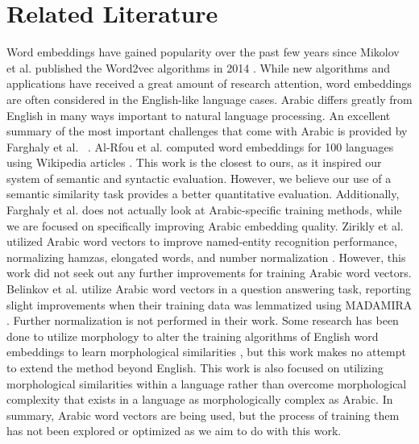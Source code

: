 \section{Related Literature}
\label{sec:literature}

Word embeddings have gained popularity over the past few years since Mikolov et al. published the Word2vec algorithms in 2014 \cite{mikolovdist:2013,mikoloveffic:2013}. While new algorithms and applications have received a great amount of research attention, word embeddings are often considered in the English-like language cases. Arabic differs greatly from English in many ways important to natural language processing. An excellent summary of the most important challenges that come with Arabic is provided by Farghaly et al. ~\cite{farghaly:2009}. Al-Rfou et al. computed word embeddings for 100 languages using Wikipedia articles \cite{al:2013}. This work is the closest to ours, as it inspired our system of semantic and syntactic evaluation. However, we believe our use of a semantic similarity task provides a better quantitative evaluation. Additionally, Farghaly et al. does not actually look at Arabic-specific training methods, while we are focused on specifically improving Arabic embedding quality. Zirikly et al. utilized Arabic word vectors to improve named-entity recognition performance, normalizing hamzas, elongated words, and number normalization \cite{zirikly:2015}. However, this work did not seek out any further improvements for training Arabic word vectors. Belinkov et al. utilize Arabic word vectors in a question answering task, reporting slight improvements when their training data was lemmatized using MADAMIRA \cite{belinkov:2015}. Further normalization is not performed in their work. Some research has been done to utilize morphology to alter the training algorithms of English word embeddings to learn morphological similarities \cite{luong2013better}, but this work makes no attempt to extend the method beyond English. This work is also focused on utilizing morphological similarities within a language rather than overcome morphological complexity that exists in a language as morphologically complex as Arabic. In summary, Arabic word vectors are being used, but the process of training them has not been explored or optimized as we aim to do with this work.

